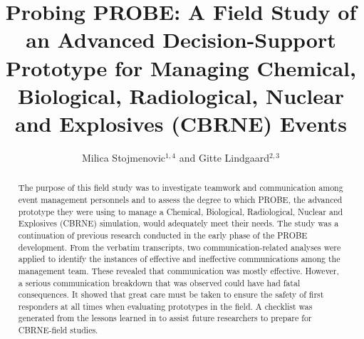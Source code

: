 \documentclass[link]{IWCOMP}
\begin{document}
\title[CBRNE Teamwork and Communication]{Probing PROBE: A Field Study of an Advanced
Decision-Support Prototype for Managing Chemical, Biological, Radiological,
Nuclear and Explosives (CBRNE) Events}

\author{Milica Stojmenovic$^{1,4}$ and Gitte Lindgaard$^{2,3}$}



\begin{abstract}
The purpose of this field study was to investigate teamwork and
communication among event management personnels and to assess the degree to
which PROBE, the advanced prototype they were using to manage a Chemical,
Biological, Radiological, Nuclear and Explosives (CBRNE) simulation, would
adequately meet their needs. The study was a continuation of previous
research conducted in the early phase of the PROBE development. From the
verbatim transcripts, two communication-related analyses were applied to
identify the instances of effective and ineffective communications among the
management team. These revealed that communication was mostly effective.
However, a serious communication breakdown that was observed could have had
fatal consequences. It showed that great care must be taken to ensure the
safety of first responders at all times when evaluating prototypes in the
field. A checklist was generated from the lessons learned in to assist
future researchers to prepare for CBRNE-field studies.
\end{abstract}




\maketitle
\end{document}
